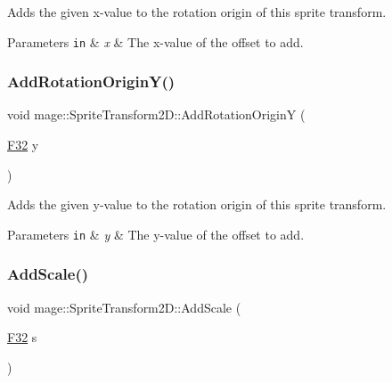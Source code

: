 Adds the given x-\/value to the rotation origin of this sprite transform.


\begin{DoxyParams}[1]{Parameters}
\mbox{\tt in}  & {\em x} & The x-\/value of the offset to add. \\
\hline
\end{DoxyParams}
\mbox{\label{classmage_1_1_sprite_transform2_d_a177f639c32e9c227ed8a9a810d450456}} 
\subsubsection{\texorpdfstring{Add\+Rotation\+Origin\+Y()}{AddRotationOriginY()}}
{\footnotesize\ttfamily void mage\+::\+Sprite\+Transform2\+D\+::\+Add\+Rotation\+OriginY (\begin{DoxyParamCaption}\item[{\mbox{\hyperlink{namespacemage_aa97e833b45f06d60a0a9c4fc22ae02c0}{F32}}}]{y }\end{DoxyParamCaption})\hspace{0.3cm}{\ttfamily [noexcept]}}

Adds the given y-\/value to the rotation origin of this sprite transform.


\begin{DoxyParams}[1]{Parameters}
\mbox{\tt in}  & {\em y} & The y-\/value of the offset to add. \\
\hline
\end{DoxyParams}
\mbox{\label{classmage_1_1_sprite_transform2_d_a35a27eef9e2ed7f0e31956f26cd4511a}} 
\subsubsection{\texorpdfstring{Add\+Scale()}{AddScale()}\hspace{0.1cm}{\footnotesize\ttfamily [1/4]}}
{\footnotesize\ttfamily void mage\+::\+Sprite\+Transform2\+D\+::\+Add\+Scale (\begin{DoxyParamCaption}\item[{\mbox{\hyperlink{namespacemage_aa97e833b45f06d60a0a9c4fc22ae02c0}{F32}}}]{s }\end{DoxyParamCaption})\hspace{0.3cm}{\ttfamily [noexcept]}}


